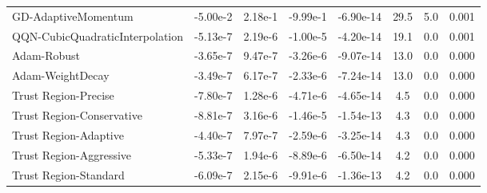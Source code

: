 \documentclass{article}
\begin{document}
\begin{table}[htbp]
{\begin{tabular}{p{2.5cm}*{7}{c}}
GD-AdaptiveMomentum & -5.00e-2 & 2.18e-1 & -9.99e-1 & -6.90e-14 & 29.5 & 5.0 & 0.001 \\
QQN-CubicQuadraticInterpolation & -5.13e-7 & 2.19e-6 & -1.00e-5 & -4.20e-14 & 19.1 & 0.0 & 0.001 \\
Adam-Robust & -3.65e-7 & 9.47e-7 & -3.26e-6 & -9.07e-14 & 13.0 & 0.0 & 0.000 \\
Adam-WeightDecay & -3.49e-7 & 6.17e-7 & -2.33e-6 & -7.24e-14 & 13.0 & 0.0 & 0.000 \\
Trust Region-Precise & -7.80e-7 & 1.28e-6 & -4.71e-6 & -4.65e-14 & 4.5 & 0.0 & 0.000 \\
Trust Region-Conservative & -8.81e-7 & 3.16e-6 & -1.46e-5 & -1.54e-13 & 4.3 & 0.0 & 0.000 \\
Trust Region-Adaptive & -4.40e-7 & 7.97e-7 & -2.59e-6 & -3.25e-14 & 4.3 & 0.0 & 0.000 \\
Trust Region-Aggressive & -5.33e-7 & 1.94e-6 & -8.89e-6 & -6.50e-14 & 4.2 & 0.0 & 0.000 \\
Trust Region-Standard & -6.09e-7 & 2.15e-6 & -9.91e-6 & -1.36e-13 & 4.2 & 0.0 & 0.000 \\
\bottomrule
\end{tabular}
}
\end{table}
\end{document}
